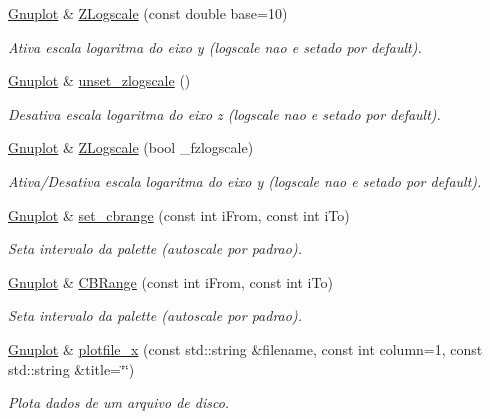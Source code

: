 \begin{DoxyCompactItemize}
\hyperlink{class_gnuplot}{Gnuplot} \& \hyperlink{class_gnuplot_a4a875f9e3f43e22d30be8e52c33df620}{Z\+Logscale} (const double base=10)
\begin{DoxyCompactList}\small\item\em Ativa escala logaritma do eixo y (logscale nao e setado por default). \end{DoxyCompactList}\item 
\hyperlink{class_gnuplot}{Gnuplot} \& \hyperlink{class_gnuplot_a294d7473091f849fe70e4dba8df8712a}{unset\+\_\+zlogscale} ()
\begin{DoxyCompactList}\small\item\em Desativa escala logaritma do eixo z (logscale nao e setado por default). \end{DoxyCompactList}\item 
\hyperlink{class_gnuplot}{Gnuplot} \& \hyperlink{class_gnuplot_af0157431e784eead31de6eb4e3e5d095}{Z\+Logscale} (bool \+\_\+fzlogscale)
\begin{DoxyCompactList}\small\item\em Ativa/\+Desativa escala logaritma do eixo y (logscale nao e setado por default). \end{DoxyCompactList}\item 
\hyperlink{class_gnuplot}{Gnuplot} \& \hyperlink{class_gnuplot_a2c8c8ae0441f54dd728bc6594051c137}{set\+\_\+cbrange} (const int i\+From, const int i\+To)
\begin{DoxyCompactList}\small\item\em Seta intervalo da palette (autoscale por padrao). \end{DoxyCompactList}\item 
\hyperlink{class_gnuplot}{Gnuplot} \& \hyperlink{class_gnuplot_ab5b863b17dcc767214e472330bceedca}{C\+B\+Range} (const int i\+From, const int i\+To)
\begin{DoxyCompactList}\small\item\em Seta intervalo da palette (autoscale por padrao). \end{DoxyCompactList}\item 
\hyperlink{class_gnuplot}{Gnuplot} \& \hyperlink{class_gnuplot_a4ca35415fa5560764597cfdfa46c6c40}{plotfile\+\_\+x} (const std\+::string \&filename, const int column=1, const std\+::string \&title=\char`\"{}\char`\"{})
\begin{DoxyCompactList}\small\item\em Plota dados de um arquivo de disco. \end{DoxyCompactList}\item 

\end{DoxyCompactItemize}
